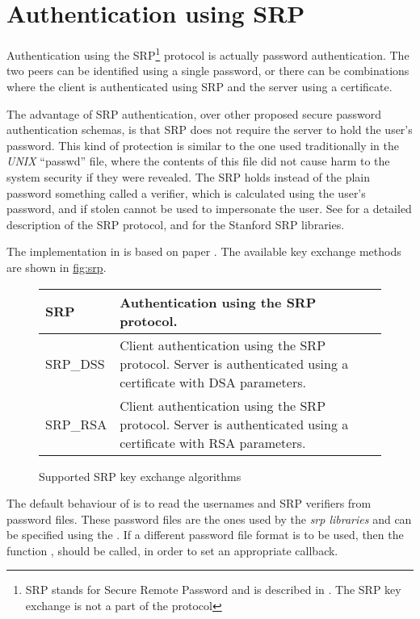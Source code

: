 \section{Authentication using SRP}

Authentication using the SRP\footnote{SRP stands for Secure Remote Password and 
is described in \cite{RFC2945}. The SRP key exchange is not a part of the \tlsI{} protocol}
protocol is actually password authentication. The two peers can be identified using a
single password, or there can be combinations where the client is 
authenticated using SRP and the server using a certificate.
\par
The advantage of SRP authentication, over other proposed secure password 
authentication schemas, is that SRP does not require the server to hold
the user's password. This kind of protection is similar to the one used traditionally
in the \emph{UNIX} ``passwd'' file, where the contents of this file did not cause
harm to the system security if they were revealed.
The SRP holds instead of the plain password something called a verifier, 
which is calculated using the user's password, and if stolen cannot
be used to impersonate the user. See \cite{TOMSRP} for a detailed description
of the SRP protocol, and for the Stanford SRP libraries.

\par
The implementation in \gnutls{} is based on paper \cite{TLSSRP}.
The available key exchange methods are shown in \hyperref{figure}{figure }{}{fig:srp}.

\begin{figure}[hbtp]
\begin{tabular}{|l|p{9cm}|}

\hline
SRP & Authentication using the SRP protocol. 
\\
\hline
SRP\_DSS & Client authentication using the SRP protocol. Server is 
authenticated using a certificate with DSA parameters.
\\
\hline
SRP\_RSA & Client authentication using the SRP protocol. Server is 
authenticated using a certificate with RSA parameters.
\\
\hline
\end{tabular}

\caption{Supported SRP key exchange algorithms}
\label{fig:srp}

\end{figure}

The default behaviour of \gnutls{} is to read the usernames and
SRP verifiers from password files. These password files are the ones used
by the \emph{srp libraries} and can be specified using the
.
If a different password file format is to be used, then the 
function ,
should be called, in order to set an appropriate callback.

